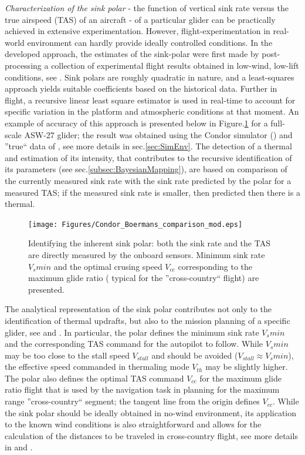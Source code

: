 \documentclass{ifacconf}
\begin{document}
\emph{Characterization of the sink polar} - the function of vertical sink
rate versus the true airspeed (TAS) of an aircraft - of a particular glider
can be practically achieved in extensive experimentation. However,
flight-experimentation in real-world environment can hardly provide ideally
controlled conditions. In the developed approach, the estimates of the
sink-polar were first made by post-processing a collection of experimental
flight results obtained in low-wind, low-lift conditions, see
\cite{AKlass_JGCD:2012}. Sink polars are roughly quadratic in nature, and a
least-squares approach yields suitable coefficients based on the historical
data. Further in flight, a recursive linear least square estimator is used in
real-time to account for specific variation in the platform and atmospheric
conditions at that moment. An example of accuracy of this approach is
presented below in Figure.\ref{fig:SinkPolar} for a full-scale ASW-27 glider;
the result was obtained using the Condor simulator
(\cite{Condor:2013:Online}) and ''true`` data of \cite{Boermans:1994}, see
more details in sec.\ref{sec:SimEnv}. The detection of a thermal and
estimation of its intensity, that contributes to the recursive identification
of its parameters (see sec.\ref{subsec:BayesianMapping}), are based on
comparison of the currently measured sink rate with the sink rate predicted
by the polar for a measured TAS; if the measured sink rate is smaller, then
predicted then there is a thermal.
\begin{figure}[thpb]
  \centering
  \texttt{[image: Figures/Condor\_Boermans\_comparison\_mod.eps]}
  \caption{Identifying the inherent sink polar: both the sink rate and the
  TAS are directly measured by the onboard sensors. Minimum sink rate
  $V_s min$ and the optimal crusing speed $V_{cc}$  corresponding to
  the maximum glide ratio ( typical for the ''cross-country`` flight) are
  presented.}
  \label{fig:SinkPolar}
\end{figure}
The analytical representation of the sink polar contributes not only to the
identification of thermal updrafts, but also to the mission planning of a
specific glider, see \cite{Piggott:1997} and \cite{FAA:2011}. In particular,
the polar defines the minimum sink rate $V_{s}min$ and the corresponding TAS
command for the autopilot to follow. While $V_{s}min$ may be too close to the
stall speed $V_{stall}$ and should be avoided ($V_{stall} \approx V_{s}min$),
the effective speed commanded in thermaling mode $V_{th}$ may be slightly
higher. The polar also defines the optimal TAS command $V_{cc}$ for the
maximum glide ratio flight that is used by the navigation task in planning
for the maximum range ''cross-country`` segment; the tangent line from the
origin defines $V_{cc}$. While the sink polar should be ideally obtained in
no-wind environment, its application to the known wind conditions is also
straightforward and allows for the calculation of the distances to be
traveled in cross-country flight, see more details in \cite{Piggott:1997} and
\cite{FAA:2011}.
\end{document}
